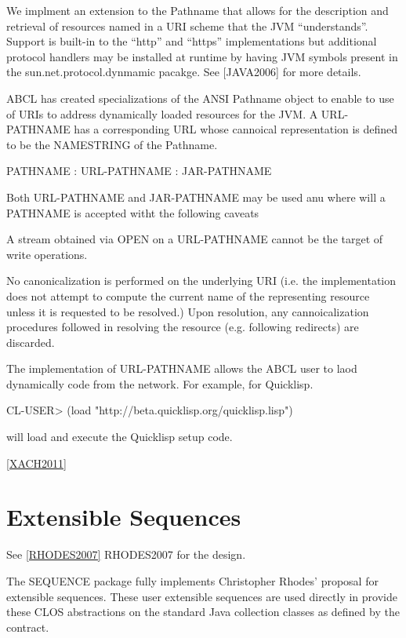 \documentclass[10pt]{book}
\begin{document}
We implment an extension to the Pathname that allows for the
description and retrieval of resources named in a URI scheme that the
JVM ``understands''.  Support is built-in to the ``http'' and
``https'' implementations but additional protocol handlers may be
installed at runtime by having JVM symbols present in the
sun.net.protocol.dynmamic pacakge. See [JAVA2006] for more details.

ABCL has created specializations of the ANSI Pathname object to
enable to use of URIs to address dynamically loaded resources for the
JVM.  A URL-PATHNAME has a corresponding URL whose cannoical
representation is defined to be the NAMESTRING of the Pathname.

PATHNAME : URL-PATHNAME : JAR-PATHNAME

Both URL-PATHNAME and JAR-PATHNAME may be used anu where will a
PATHNAME is accepted witht the following caveats

A stream obtained via OPEN on a URL-PATHNAME cannot be the target of
write operations.

No canonicalization is performed on the underlying URI (i.e. the
implementation does not attempt to compute the current name of the
representing resource unless it is requested to be resolved.)  Upon
resolution, any cannoicalization procedures followed in resolving the
resource (e.g. following redirects) are discarded.  

The implementation of URL-PATHNAME allows the ABCL user to laod dynamically
code from the network.  For example, for Quicklisp.

\begin{listing-lisp}
  CL-USER> (load "http://beta.quicklisp.org/quicklisp.lisp")
\end{listing-lisp}

will load and execute the Quicklisp setup code.

\ref{XACH2011}
         
\section{Extensible Sequences}

See \ref{RHODES2007} RHODES2007 for the design.

The SEQUENCE package fully implements Christopher Rhodes' proposal for
extensible sequences.  These user extensible sequences are used
directly in  provide these CLOS
abstractions on the standard Java collection classes as defined by the
 contract.
\end{document}
